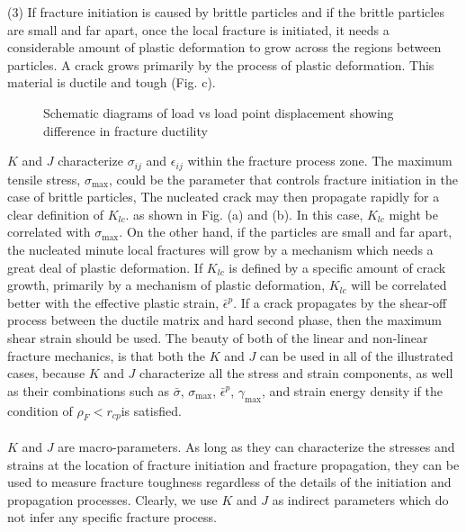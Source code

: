 \documentclass[11pt]{article}
\begin{document}
(3) If fracture initiation is caused by brittle particles and if the brittle particles are small and far
apart, once the local fracture is initiated, it needs a considerable amount of plastic deformation to grow
across the regions between particles. A crack grows primarily by the process of plastic deformation.
This material is ductile and tough (Fig. c).
\begin{figure}[H]
    \centering
    \captionsetup{labelformat=empty}
    \caption{Schematic diagrams of load vs load point displacement showing difference in fracture ductility}
\end{figure}
$K$ and $J$ characterize $\sigma_{ij}$ and $\epsilon_{ij}$ within the fracture process zone. The maximum tensile stress, $\sigma_{\text{max}}$,
could be the parameter that controls fracture initiation in the case of brittle particles, The nucleated
crack may then propagate rapidly for a clear definition of $K_{lc}$. as shown in Fig. (a) and (b). In this
case, $K_{lc}$ might be correlated with $\sigma_{\text{max}}$. On the other hand, if the particles are small and far apart, the
nucleated minute local fractures will grow by a mechanism which needs a great deal of plastic
deformation. If $K_{lc}$ is defined by a specific amount of crack growth, primarily by a mechanism of plastic
deformation, $K_{lc}$ will be correlated better with the effective plastic strain, $\bar{\epsilon} ^ p$. If a crack propagates by
the shear-off process between the ductile matrix and hard second phase, then the maximum shear strain
should be used. The beauty of both of the linear and non-linear fracture mechanics, is that both the $K$
and $J$ can be used in all of the illustrated cases, because $K$ and $J$ characterize all the stress and strain
components, as well as their combinations such as $\bar{\sigma}$, $\sigma_{\text{max}}$, $\bar{\epsilon} ^ p$, $\gamma_{\text{max}}$, and strain energy density if the
condition of $\rho_F < r_{cp}$is satisfied.
\\\\
$K$ and $J$ are macro-parameters. As long as they can characterize the stresses and strains at the
location of fracture initiation and fracture propagation, they can be used to measure fracture toughness
regardless of the details of the initiation and propagation processes. Clearly, we use $K$ and $J$ as indirect
parameters which do not infer any specific fracture process.
\end{document}
